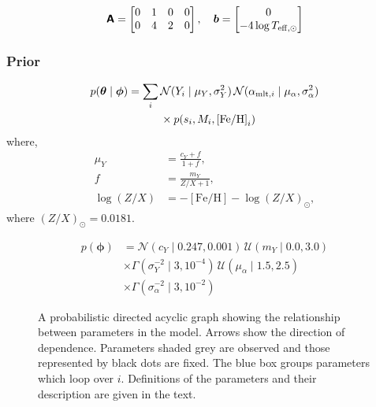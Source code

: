 \documentclass[fleqn,usenatbib]{mnras}
\newcommand{\normaldist}{\mathcal{N}}
\newcommand{\uniformdist}{\mathcal{U}}
\newcommand{\gammadist}{\Gamma}
\renewcommand*{\vec}[1]{\boldsymbol{#1}}
\newcommand*{\mat}[1]{\boldsymbol{\mathsf{#1}}}
\newcommand{\dydz}{\ensuremath{m_Y}}
\newcommand{\yp}{\ensuremath{c_Y}}
\newcommand{\eep}{\ensuremath{s}}
\newcommand{\feh}{\ensuremath{\mathrm{[Fe/H]}}}
\newcommand{\mlt}[1][]{{\ensuremath{\alpha_{\mathrm{mlt} \ifx#1\empty \else , #1 \fi}}}}
\newcommand{\teff}[1][]{{\ensuremath{T_{\mathrm{eff} \ifx#1\empty \else , #1 \fi}}}}
\begin{document}
\begin{equation}
    \mat A = 
    \begin{bmatrix}
        0 & 1 & 0 & 0\\
        0 & 4 & 2 & 0
    \end{bmatrix}
    , \quad
    \vec b =
    \begin{bmatrix}
        0\\
        - 4 \log \teff[\odot]
    \end{bmatrix}
\end{equation}


\subsubsection{Prior}

\begin{equation}
    \begin{split}
        p(\vec{\theta} \mid \vec\phi) = \sum_i \, &\normaldist(Y_i \mid \mu_Y, \sigma_Y^2) \, \normaldist(\mlt[i] \mid \mu_\alpha, \sigma_\alpha^2) \\
        &\times p(\eep_i, M_i, \feh_i)
    \end{split}
\end{equation}
%
where,
%
\begin{align}
    \mu_Y &= \frac{\yp + f}{1 + f}, \\
    f &= \frac{\dydz}{Z / X + 1}, \\
    \log({Z}/{X}) &= - \feh - \log({Z}/{X})_\odot,
\end{align}
%
where \((Z/X)_\odot = 0.0181\).

%
\begin{equation}
    \begin{split}
        p(\vec\phi) &= \normaldist(\yp \mid 0.247, 0.001) \, \uniformdist(\dydz \mid 0.0, 3.0) \\
        &\times \gammadist(\sigma_Y^{-2} \mid 3, 10^{-4}) \, \uniformdist(\mu_\alpha \mid 1.5, 2.5) \\
        &\times \gammadist(\sigma_\alpha^{-2} \mid 3, 10^{-2})
    \end{split}
\end{equation}

\begin{figure}
    \centering
    
    \caption{A probabilistic directed acyclic graph showing the relationship between parameters in the model. Arrows show the direction of dependence.
    Parameters shaded grey are observed and those represented by black dots are fixed. 
    The blue box groups parameters which loop over \(i\). Definitions of the parameters and their description are given in the text.
    }
\end{figure}
\end{document}
